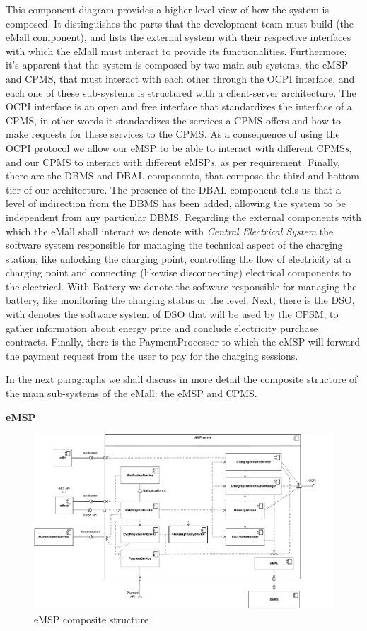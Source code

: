 This component diagram provides a higher level view of how the system is composed. It distinguishes the parts that the development team must build (the eMall component), and lists the external system with their respective interfaces with which the eMall must interact to provide its functionalities. Furthermore, it's apparent that the system is composed by two main sub-systems, the eMSP and CPMS, that must interact with each other through the OCPI interface, and each one of these sub-systems is structured with a client-server architecture. The OCPI interface is an open and free interface that standardizes the interface of a CPMS, in other words it standardizes the services a CPMS offers and how to make requests for these services to the CPMS. As a consequence of using the OCPI protocol we allow our eMSP to be able to interact with different CPMS\textit{s}, and our CPMS to interact with different eMSP\textit{s}, as per requirement. Finally, there are the DBMS and DBAL components, that compose the third and bottom tier of our architecture. The presence of the DBAL component tells us that a level of indirection from the DBMS has been added, allowing the system to be independent from any particular DBMS. Regarding the external components with which the eMall shall interact we denote with \textit{Central Electrical System} the software system responsible for managing the technical aspect of the charging station, like unlocking the charging point, controlling the flow of electricity at a charging point and connecting (likewise disconnecting) electrical components to the electrical. With Battery we denote the software responsible for managing the battery, like monitoring the charging status or the level. Next, there is the DSO, with denotes the software system of DSO that will be used by the CPSM, to gather information about energy price and conclude electricity purchase contracts. Finally, there is the PaymentProcessor to which the eMSP will forward the payment request from the user to pay for the charging sessions.
\par
In the next paragraphs we shall discuss in more detail the composite structure of the main sub-systems of the eMall: the eMSP and CPMS.
\pagebreak

\textbf{eMSP}\\
\begin{figure}[H]
    \centering
    \includegraphics[width=1\textwidth]{Images/cp2/eMSP_server.pdf}
    \caption{eMSP composite structure}
\end{figure}

